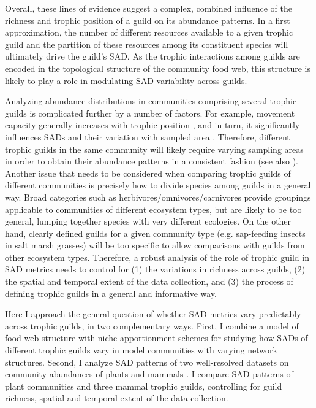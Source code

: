 Overall, these lines of evidence suggest a complex, combined influence of the richness and trophic position of a guild on its abundance patterns. In a first approximation, the number of different resources available to a given trophic guild and the partition of these resources among its constituent species \citep{Tokeshi1990, Sugihara2003} will ultimately drive the guild's SAD. As the trophic interactions among guilds are encoded in the topological structure of the community food web, this structure is likely to play a role in modulating SAD variability across guilds.

Analyzing abundance distributions in communities comprising several trophic guilds is complicated further by a number of factors. For example, movement capacity generally increases with trophic position \citep{McCann2005}, and in turn, it significantly influences SADs and their variation with sampled area \citep{Borda-de-Agua2017}. Therefore, different trophic guilds in the same community will likely require varying sampling areas in order to obtain their abundance patterns in a consistent fashion (see also \citealt{Holt1999}). Another issue that needs to be considered when comparing trophic guilds of different communities is precisely how to divide species among guilds in a general way. Broad categories such as herbivores/omnivores/carnivores provide groupings applicable to communities of different ecosystem types, but are likely to be too general, lumping together species with very different ecologies. On the other hand, clearly defined guilds for a given community type (e.g. sap-feeding insects in salt marsh grasses) will be too specific to allow comparisons with guilds from other ecosystem types. Therefore, a robust analysis of the role of trophic guild in SAD metrics needs to control for (1) the variations in richness across guilds, (2) the spatial and temporal extent of the data collection, and (3) the process of defining trophic guilds in a general and informative way.

Here I approach the general question of whether SAD metrics vary predictably across trophic guilds, in two complementary ways. First, I combine a model of food web structure with niche apportionment schemes for studying how SADs of different trophic guilds vary in model communities with varying network structures. Second, I analyze SAD patterns of two well-resolved datasets on community abundances of plants \citep{Phillips2002} and mammals \citep{Thibault2011}. I compare SAD patterns of plant communities and three mammal trophic guilds, controlling for guild richness, spatial and temporal extent of the data collection.

